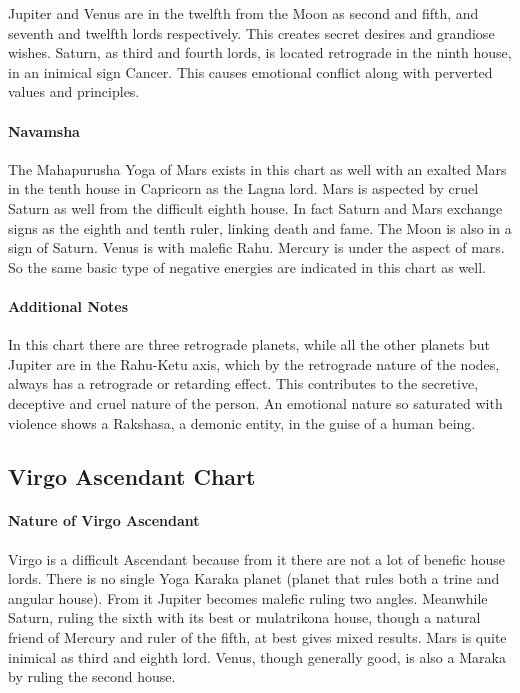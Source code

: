  

Jupiter and Venus are in the twelfth from the Moon as second and fifth, and seventh and twelfth lords respectively. This creates secret desires and grandiose wishes. Saturn, as third and fourth lords, is located retrograde in the ninth house, in an inimical sign Cancer. This causes emotional conflict along with perverted values and principles.

 

\paragraph{Navamsha}

 

The Mahapurusha Yoga of Mars exists in this chart as well with an exalted Mars in the tenth house in Capricorn as the Lagna lord. Mars is aspected by cruel Saturn as well from the difficult eighth house. In fact Saturn and Mars exchange signs as the eighth and tenth ruler, linking death and fame. The Moon is also in a sign of Saturn. Venus is with malefic Rahu. Mercury is under the aspect of mars. So the same basic type of negative energies are indicated in this chart as well.

 

\paragraph{Additional Notes}

 

In this chart there are three retrograde planets, while all the other planets but Jupiter are in the Rahu-Ketu axis, which by the retrograde nature of the nodes, always has a retrograde or retarding effect. This contributes to the secretive, deceptive and cruel nature of the person. An emotional nature so saturated with violence shows a Rakshasa, a demonic entity, in the guise of a human being.

\subsection{Virgo Ascendant Chart}
 

\paragraph{Nature of Virgo Ascendant}

 

Virgo is a difficult Ascendant because from it there are not a lot of benefic house lords. There is no single Yoga Karaka planet (planet that rules both a trine and angular house). From it Jupiter becomes malefic ruling two angles. Meanwhile Saturn, ruling the sixth with its best or mulatrikona house, though a natural friend of Mercury and ruler of the fifth, at best gives mixed results. Mars is quite inimical as third and eighth lord. Venus, though generally good, is also a Maraka by ruling the second house.

